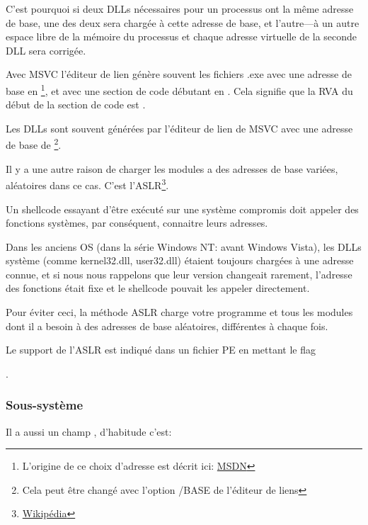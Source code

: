 C'est pourquoi si deux DLLs nécessaires pour un processus ont la même adresse de base,
une des deux sera chargée à cette adresse de base, et l'autre---à un autre espace
libre de la mémoire du processus et chaque adresse virtuelle de la seconde DLL sera
corrigée.

\par Avec \ac{MSVC} l'éditeur de lien génère souvent les fichiers .exe avec une adresse
de base en \footnote{L'origine de ce choix d'adresse est décrit ici:
\href{http://go.yurichev.com/17041}{MSDN}}, et avec une section de code débutant
en .
Cela signifie que la \ac{RVA} du début de la section de code est .

Les DLLs sont souvent générées par l'éditeur de lien de MSVC avec une adresse de
base de \footnote{Cela peut être changé avec l'option /BASE de l'éditeur
de liens}.


Il y a une autre raison de charger les modules a des adresses de base variées, aléatoires
dans ce cas. C'est l'\ac{ASLR}\footnote{\href{http://go.yurichev.com/17140}{Wikipédia}}.


Un shellcode essayant d'être exécuté sur une système compromis doit appeler des fonctions
systèmes, par conséquent, connaitre leurs adresses.

Dans les anciens \ac{OS} (dans la série \gls{Windows NT}: avant Windows Vista), les
DLLs système (comme kernel32.dll, user32.dll) étaient toujours chargées à une adresse
connue, et si nous nous rappelons que leur version changeait rarement, l'adresse
des fonctions était fixe et le shellcode pouvait les appeler directement.

Pour éviter ceci, la méthode \ac{ASLR} charge votre programme et tous les modules
dont il a besoin à des adresses de base aléatoires, différentes à chaque fois.

Le support de l'\ac{ASLR} est indiqué dans un fichier PE en mettant le flag
\par {} .

\subsubsection{Sous-système}

Il a aussi un champ , d'habitude c'est:

